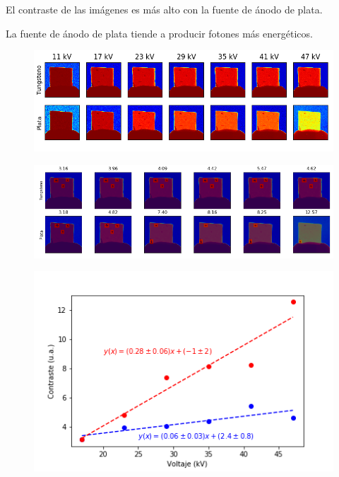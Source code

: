 \documentclass{sciposter}
\begin{document}
\begin{multicols}{3}
	El contraste de las imágenes es más alto con la fuente de ánodo de plata.
	
	La fuente de ánodo de plata tiende a producir fotones más energéticos.
	
	\begin{figure}[h]
		\centering
		\includegraphics[width = \linewidth]{Figuras/Images.png}
	\end{figure}
	
	\begin{figure}[h]
		\centering
		\includegraphics[width = \linewidth]{Figuras/ContrasteImages.png}
	\end{figure}
	
	\begin{figure}[h]
		\centering
		\includegraphics[width = \linewidth]{Figuras/Contraste.png}
	\end{figure}


\end{multicols}
\end{document}
